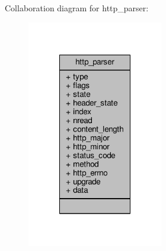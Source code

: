 Collaboration diagram for http\-\_\-parser\-:
\nopagebreak
\begin{figure}[H]
\begin{center}
\leavevmode
\includegraphics[width=168pt]{structhttp__parser__coll__graph}
\end{center}
\end{figure}
